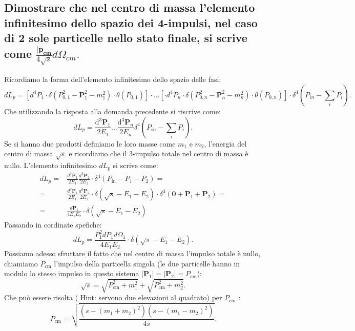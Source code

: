 \subsection[\hspace{2mm} Elemento infinitesimo nello spazio dei quadrimpulsi nel centro di massa (due particelle)]{Dimostrare che nel centro di massa l’elemento infinitesimo dello spazio dei 4-impulsi, nel caso di 2 sole particelle nello stato finale, si scrive come $\frac{|\boldsymbol{p_{cm}}}{4\sqrt{s}} d\Omega_{cm}.$}
Ricordiamo la forma dell'elemento infinitesimo dello spazio delle fasi:
\[
	dL_p = \left[ d^4P_1 \cdot \delta\left( P_{0,1}^2 - \boldsymbol{P}_1^2 - m_1^2 \right) \cdot \theta\left( P_{0,1} \right) \right] \cdot \ldots 
	\left[ \cdot d^4P_n \cdot \delta\left( P_{0,n}^2 - \boldsymbol{P}_n^2 - m_n^2 \right) \cdot \theta\left( P_{0,n} \right) \right] \cdot 
	\delta^4\left(  P_{in}-\sum_{i}P_i  \right) 
.\]
Che utilizzando la risposta alla domanda precedente si riscrive come:
\[
dL_p = \frac{\mbox{d}^3 \boldsymbol{P}_1}{2E_1} \ldots \frac{\mbox{d}^3 \boldsymbol{P}_n}{2E_n} \delta^4\left( P_{in}-\sum_{i}P_i \right) 
.\] 
Se si hanno due prodotti definiamo le loro masse come $m_1$ e  $m_2$, l'energia del centro di massa $\sqrt{s}$ e ricordiamo che il 3-impulso totale nel centro di massa è nullo. L'elemento infinitesimo $dL_p$ si scrive come:
\begin{align*}
	dL_p =& \frac{d^3 \boldsymbol{P}_1}{2E_1} \frac{d^3 \boldsymbol{P}_2}{2E_2} \cdot \delta^4\left(P_{\text{in}} - P_1 - P_2 \right) = \\ 
	= & \frac{d^3 \boldsymbol{P}_1}{2E_1} \frac{d^3 \boldsymbol{P}_2}{2E_2} \cdot \delta\left( \sqrt{s}-E_1-E_2\right) \cdot 
	\delta^3\left( \boldsymbol{0} + \boldsymbol{P}_1 + \boldsymbol{P}_2 \right) = \\
	= & \frac{ d \boldsymbol{P}_1 }{4E_1E_2} \cdot \delta\left( \sqrt{s}-E_1-E_2\right)   
\end{align*}
Passando in cordinate spefiche:
\[
	dL_p = \frac{P_1^2 dP_1 d \Omega_1 }{4E_1E_2} \cdot \delta\left( \sqrt{s} -E_1-E_2  \right) 
.\]
Possiamo adesso sfruttare il fatto che nel centro di massa l'impulso totale è nullo, chiamiamo $P_{\text{cm}}$ l'impulso della particella singola (le due particelle hanno in modulo lo stesso impulso in questo sistema $\left| \boldsymbol{P}_1 \right| = \left| \boldsymbol{P}_2 \right| = P_{\text{cm}}$):
\[
	\sqrt{s}= \sqrt{P_{\text{cm}}^2 + m_1^2} + \sqrt{ P_{\text{cm}}^2 + m_2^2} 
.\] 
Che può essere risolta ( Hint: servono due elevazioni al quadrato) per $P_{\text{cm}}$ :
\[
	P_{\text{cm}} = \sqrt{\frac{\left( s - \left( m_1+m_2 \right)^2 \right) \left( s - \left( m_1 - m_2 \right)^2 \right)}{4s}} 
.\]
